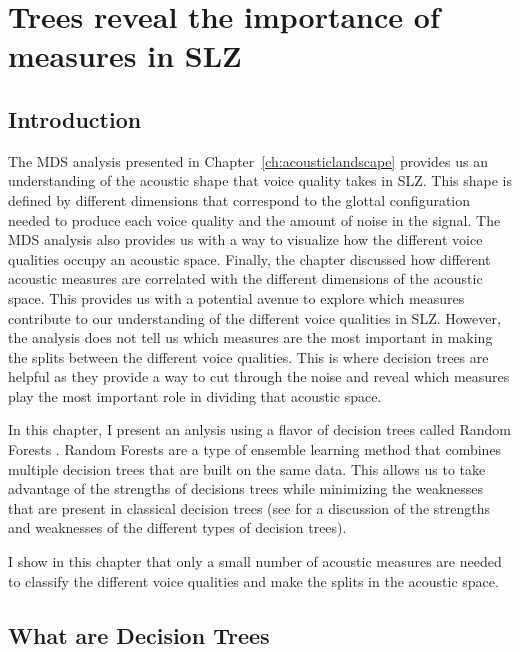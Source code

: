 \chapter{Trees reveal the importance of measures in SLZ} \label{ch:revealing_trees}

\section{Introduction} \label{sec:bagging_intro}

The MDS analysis presented in Chapter~\ref{ch:acousticlandscape} provides us an understanding of the acoustic shape that voice quality takes in SLZ. This shape is defined by different dimensions that correspond to the glottal configuration needed to produce each voice quality and the amount of noise in the signal. The MDS analysis also provides us with a way to visualize how the different voice qualities occupy an acoustic space. Finally, the chapter discussed how different acoustic measures are correlated with the different dimensions of the acoustic space. This provides us with a potential avenue to explore which measures contribute to our understanding of the different voice qualities in SLZ.
However, the analysis does not tell us which measures are the most important in making the splits between the different voice qualities. This is where decision trees are helpful as they provide a way to cut through the noise and reveal which measures play the most important role in dividing that acoustic space. 

In this chapter, I present an anlysis using a flavor of decision trees called Random Forests \citep{breimanClassificationRegressionTrees1986,breimanRandomForests2001}. Random Forests are a type of ensemble learning method that combines multiple decision trees that are built on the same data. This allows us to take advantage of the strengths of decisions trees while minimizing the weaknesses that are present in classical decision trees (see \cite{hastieElementsStatisticalLearning2009,boehmkeHandsOnMachineLearning2019,jamesIntroductionStatisticalLearning2021} for a discussion of the strengths and weaknesses of the different types of decision trees).

I show in this chapter that only a small number of acoustic measures are needed to classify the different voice qualities and make the splits in the acoustic space. 

\section{What are Decision Trees} \label{sec:what_are_dt}

